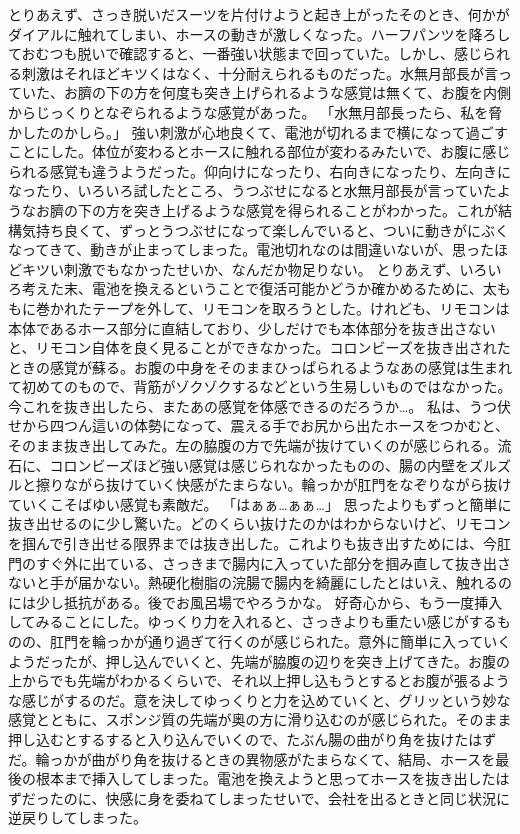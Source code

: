 とりあえず、さっき脱いだスーツを片付けようと起き上がったそのとき、何かがダイアルに触れてしまい、ホースの動きが激しくなった。ハーフパンツを降ろしておむつも脱いで確認すると、一番強い状態まで回っていた。しかし、感じられる刺激はそれほどキツくはなく、十分耐えられるものだった。水無月部長が言っていた、お臍の下の方を何度も突き上げられるような感覚は無くて、お腹を内側からじっくりとなぞられるような感覚があった。
「水無月部長ったら、私を脅かしたのかしら。」
強い刺激が心地良くて、電池が切れるまで横になって過ごすことにした。体位が変わるとホースに触れる部位が変わるみたいで、お腹に感じられる感覚も違うようだった。仰向けになったり、右向きになったり、左向きになったり、いろいろ試したところ、うつぶせになると水無月部長が言っていたようなお臍の下の方を突き上げるような感覚を得られることがわかった。これが結構気持ち良くて、ずっとうつぶせになって楽しんでいると、ついに動きがにぶくなってきて、動きが止まってしまった。電池切れなのは間違いないが、思ったほどキツい刺激でもなかったせいか、なんだか物足りない。
とりあえず、いろいろ考えた末、電池を換えるということで復活可能かどうか確かめるために、太ももに巻かれたテープを外して、リモコンを取ろうとした。けれども、リモコンは本体であるホース部分に直結しており、少しだけでも本体部分を抜き出さないと、リモコン自体を良く見ることができなかった。コロンビーズを抜き出されたときの感覚が蘇る。お腹の中身をそのままひっぱられるようなあの感覚は生まれて初めてのもので、背筋がゾクゾクするなどという生易しいものではなかった。今これを抜き出したら、またあの感覚を体感できるのだろうか…。
私は、うつ伏せから四つん這いの体勢になって、震える手でお尻から出たホースをつかむと、そのまま抜き出してみた。左の脇腹の方で先端が抜けていくのが感じられる。流石に、コロンビーズほど強い感覚は感じられなかったものの、腸の内壁をズルズルと擦りながら抜けていく快感がたまらない。輪っかが肛門をなぞりながら抜けていくこそばゆい感覚も素敵だ。
「はぁぁ…ぁぁ…」
思ったよりもずっと簡単に抜き出せるのに少し驚いた。どのくらい抜けたのかはわからないけど、リモコンを掴んで引き出せる限界までは抜き出した。これよりも抜き出すためには、今肛門のすぐ外に出ている、さっきまで腸内に入っていた部分を掴み直して抜き出さないと手が届かない。熱硬化樹脂の浣腸で腸内を綺麗にしたとはいえ、触れるのには少し抵抗がある。後でお風呂場でやろうかな。
好奇心から、もう一度挿入してみることにした。ゆっくり力を入れると、さっきよりも重たい感じがするものの、肛門を輪っかが通り過ぎて行くのが感じられた。意外に簡単に入っていくようだったが、押し込んでいくと、先端が脇腹の辺りを突き上げてきた。お腹の上からでも先端がわかるくらいで、それ以上押し込もうとするとお腹が張るような感じがするのだ。意を決してゆっくりと力を込めていくと、グリッという妙な感覚とともに、スポンジ質の先端が奥の方に滑り込むのが感じられた。そのまま押し込むとするすると入り込んでいくので、たぶん腸の曲がり角を抜けたはずだ。輪っかが曲がり角を抜けるときの異物感がたまらなくて、結局、ホースを最後の根本まで挿入してしまった。電池を換えようと思ってホースを抜き出したはずだったのに、快感に身を委ねてしまったせいで、会社を出るときと同じ状況に逆戻りしてしまった。
